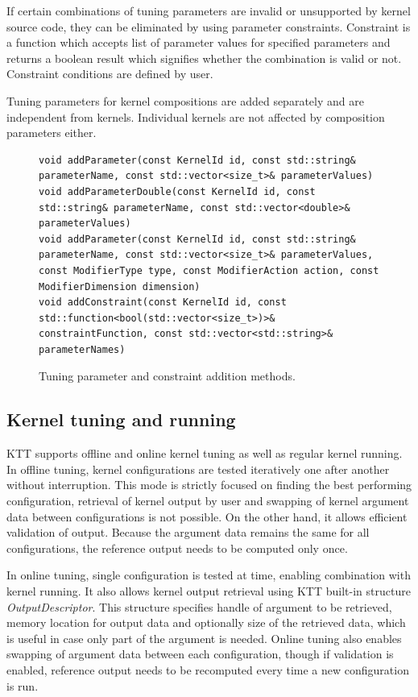 \documentclass
[
    digital, %
    oneside, %
    table, %
    nolof, %
    nolot, %
    nocover %
]{fithesis3}
\begin{document}
If certain combinations of tuning parameters are invalid or unsupported by kernel source code, they can be eliminated by using parameter constraints.
Constraint is a function which accepts list of parameter values for specified parameters and returns a boolean result which signifies whether the
combination is valid or not. Constraint conditions are defined by user.

Tuning parameters for kernel compositions are added separately and are independent from kernels. Individual kernels are not affected by composition
parameters either.

\begin{figure}
\begin{adjustwidth}{-1cm}{-1cm}
\begin{lstlisting}
void addParameter(const KernelId id, const std::string& parameterName, const std::vector<size_t>& parameterValues)
void addParameterDouble(const KernelId id, const std::string& parameterName, const std::vector<double>& parameterValues)
void addParameter(const KernelId id, const std::string& parameterName, const std::vector<size_t>& parameterValues, const ModifierType type, const ModifierAction action, const ModifierDimension dimension)
void addConstraint(const KernelId id, const std::function<bool(std::vector<size_t>)>& constraintFunction, const std::vector<std::string>& parameterNames)
\end{lstlisting}
\caption{Tuning parameter and constraint addition methods.}
\label{ktt-parameter-methods}
\end{adjustwidth}
\end{figure}

\subsection{Kernel tuning and running}
KTT supports offline and online kernel tuning as well as regular kernel running. In offline tuning, kernel configurations are tested iteratively one
after another without interruption. This mode is strictly focused on finding the best performing configuration, retrieval of kernel output by user and
swapping of kernel argument data between configurations is not possible. On the other hand, it allows efficient validation of output. Because the
argument data remains the same for all configurations, the reference output needs to be computed only once.

In online tuning, single configuration is tested at time, enabling combination with kernel running. It also allows kernel output retrieval using
KTT built-in structure \textit{OutputDescriptor}. This structure specifies handle of argument to be retrieved, memory location for output data and
optionally size of the retrieved data, which is useful in case only part of the argument is needed. Online tuning also enables swapping of argument
data between each configuration, though if validation is enabled, reference output needs to be recomputed every time a new configuration is run.
\end{document}

